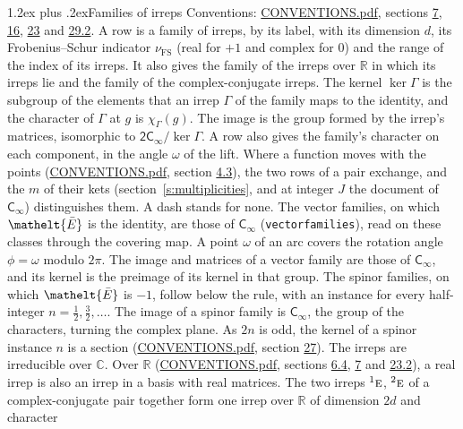 \documentclass[10pt,a4paper]{article}
\makeatletter
\renewcommand\section{\@startsection{section}{1}{\z@}{-3ex plus -1ex minus -.2ex}%
  {1.2ex plus .2ex}{\normalfont\large\sffamily\bfseries\color{parttitle}}}
\numberwithin{equation}{section}
\newcommand{\eltfont}[1]{{\let\sigma\eltsigma\mathelt{#1}}}
\newcommand{\grp}[1]{\mathsf{#1}}
\newcommand{\irr}[1]{\text{\normalfont\scshape #1}}
\newcommand{\conjpair}[1]{{}^{#1}}
\newcommand{\elt}[1]{\eltfont{#1}}
\newcommand{\irchar}[1]{\chi_{#1}}
\newcommand{\fsind}{\nu_{\mathrm{FS}}}
\newcommand{\barred}[1]{\bar{#1}}
\makeatother
\begin{document}
\section{Families of irreps}\label{s:families}
Conventions: \href{../../CONVENTIONS.pdf}{CONVENTIONS.pdf}, sections \href{../../../rotation/CONVENTIONS.pdf\#conv.7}{7}, \href{../../../rotation/CONVENTIONS.pdf\#conv.16}{16}, \href{../../CONVENTIONS.pdf\#conv.23}{23} and \href{../../CONVENTIONS.pdf\#conv.29.2}{29.2}.
\leavevmode\label{n:head.family.irreps}\label{n:index.dimension}\label{n:index.frobenius}\label{n:head.index.family}A row is a family of irreps, by its label, with its dimension $d$, its Frobenius--Schur indicator $\fsind$ (real for $+1$ and complex for $0$) and the range of the index of its irreps. \label{n:head.conjugate}\label{n:head.over.real}It also gives the family of the irreps over $\mathbb{R}$ in which its irreps lie and the family of the complex-conjugate irreps. \label{n:head.kernel}\label{n:function.character}The kernel $\ker\Gamma$ is the subgroup of the elements that an irrep $\Gamma$ of the family maps to the identity, and the character of $\Gamma$ at $g$ is $\irchar{\Gamma}(g)$. \label{n:head.image}The image is the group formed by the irrep's matrices, isomorphic to $\grp{2C_{\infty }}/\ker\Gamma$. A row also gives the family's character on each component, in the angle $\omega$ of the lift. Where a function moves with the points (\href{../../CONVENTIONS.pdf}{CONVENTIONS.pdf}, section \href{../../../rotation/CONVENTIONS.pdf\#conv.4.3}{4.3}), the two rows of a pair exchange, and the $m$ of their kets (section~\ref{s:multiplicities}, and at integer $J$ the document of \href{../../../rotation/data/pdf/Cinf.pdf}{$\grp{C_{\infty}}$}) distinguishes them. A dash stands for none. The vector families, on which $\elt{\barred{E}}$ is the identity, are those of \href{../../../rotation/data/pdf/Cinf.pdf}{$\grp{C_{\infty}}$} (\texttt{vectorfamilies}), read on these classes through the covering map. A point $\omega$ of an arc covers the rotation angle $\phi = \omega$ modulo $2\pi$. The image and matrices of a vector family are those of \href{../../../rotation/data/pdf/Cinf.pdf}{$\grp{C_{\infty}}$}, and its kernel is the preimage of its kernel in that group. The spinor families, on which $\elt{\barred{E}}$ is $-1$, follow below the rule, with an instance for every half-integer $n = \tfrac{1}{2}, \tfrac{3}{2}, \dots$. The image of a spinor family is \href{../../../rotation/data/pdf/Cinf.pdf}{$\grp{C_{\infty}}$}, the group of the characters, turning the complex plane. As $2n$ is odd, the kernel of a spinor instance $n$ is a section (\href{../../CONVENTIONS.pdf}{CONVENTIONS.pdf}, section \href{../../CONVENTIONS.pdf\#conv.27}{27}). The irreps are irreducible over $\mathbb{C}$. Over $\mathbb{R}$ (\href{../../CONVENTIONS.pdf}{CONVENTIONS.pdf}, sections \href{../../../rotation/CONVENTIONS.pdf\#conv.6.4}{6.4}, \href{../../../rotation/CONVENTIONS.pdf\#conv.7}{7} and \href{../../CONVENTIONS.pdf\#conv.23.2}{23.2}), a real irrep is also an irrep in a basis with real matrices. The two irreps $\conjpair{1}\irr{e}$, $\conjpair{2}\irr{e}$ of a complex-conjugate pair together form one irrep over $\mathbb{R}$ of dimension $2d$ and character 
\end{document}
